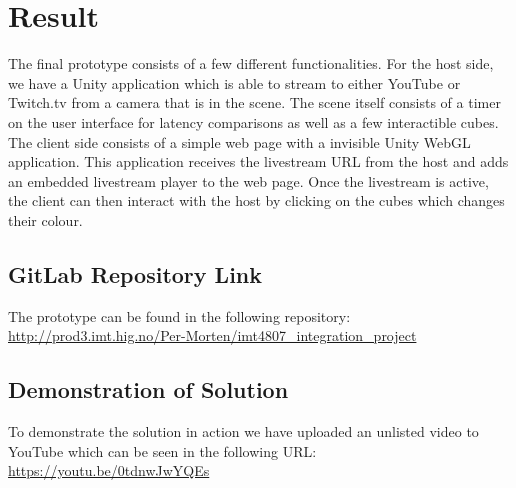 \section{Result}
The final prototype consists of a few different functionalities. For the host side, we have a Unity application which is able to stream to either YouTube or Twitch.tv from a camera that is in the scene. The scene itself consists of a timer on the user interface for latency comparisons as well as a few interactible cubes. 
The client side consists of a simple web page with a invisible Unity WebGL application. This application receives the livestream URL from the host and adds an embedded livestream player to the web page. Once the livestream is active, the client can then interact with the host by clicking on the cubes which changes their colour. 

\subsection{GitLab Repository Link}
The prototype can be found in the following repository: \\ \url{http://prod3.imt.hig.no/Per-Morten/imt4807_integration_project}

\subsection{Demonstration of Solution}
To demonstrate the solution in action we have uploaded an unlisted video to YouTube which can be seen in the following URL: \url{https://youtu.be/0tdnwJwYQEs}
